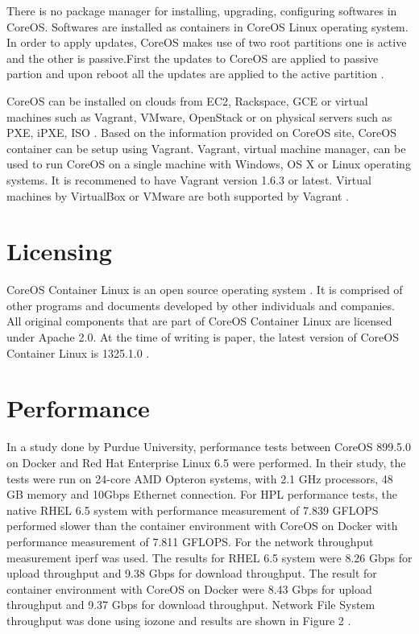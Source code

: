 \documentclass[9pt,twocolumn,twoside]{../../styles/osajnl}
\begin{document}
There is no package manager for installing, upgrading, configuring
softwares in CoreOS. Softwares are installed as containers in CoreOS
Linux operating system. In order to apply updates, CoreOS makes use of
two root partitions one is active and the other is passive.First the
updates to CoreOS are applied to passive partion and upon reboot all
the updates are applied to the active partition \cite{coreOSBook}.

CoreOS can be installed on clouds from EC2, Rackspace, GCE or virtual
machines such as Vagrant, VMware, OpenStack or on physical servers
such as PXE, iPXE, ISO \cite{www-coreOSquickstart}. Based on the
information provided on CoreOS site, CoreOS container can be setup
using Vagrant. Vagrant, virtual machine manager, can be used to run
CoreOS on a single machine with Windows, OS X or Linux operating
systems. It is recommened to have Vagrant version 1.6.3 or
latest. Virtual machines by VirtualBox or VMware are both supported by
Vagrant \cite{www-coreOSvagrant}.

\section{Licensing}

CoreOS Container Linux is an open source operating system . It is
comprised of other programs and documents developed by other
individuals and companies. All original components that are part of
CoreOS Container Linux are licensed under Apache 2.0. At the time of
writing is paper, the latest version of CoreOS Container Linux is
1325.1.0 \cite{www-core}.


\section{Performance}

In a study done by Purdue University, performance tests between CoreOS
899.5.0 on Docker and Red Hat Enterprise Linux 6.5 were performed. In
their study, the tests were run on 24-core AMD Opteron systems, with
2.1 GHz processors, 48 GB memory and 10Gbps Ethernet connection.  For
HPL performance tests, the native RHEL 6.5 system with performance
measurement of 7.839 GFLOPS performed slower than the container
environment with CoreOS on Docker with performance measurement of
7.811 GFLOPS. For the network throughput measurement iperf was
used. The results for RHEL 6.5 system were 8.26 Gbps for upload
throughput and 9.38 Gbps for download throughput. The result for
container environment with CoreOS on Docker were 8.43 Gbps for upload
throughput and 9.37 Gbps for download throughput. Network File System
throughput was done using iozone and results are shown in Figure 2
\cite{julian2016containers}.
\end{document}
